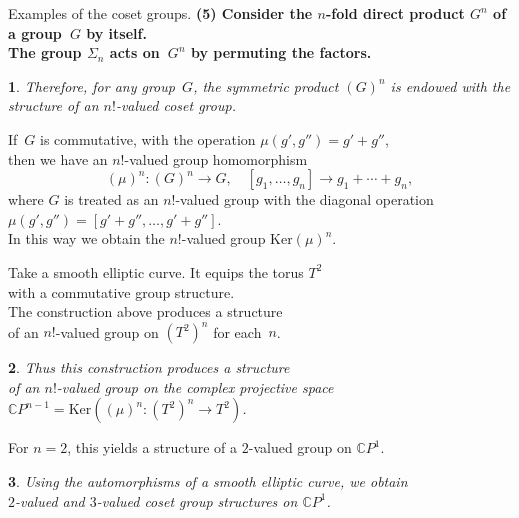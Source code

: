 \documentclass{beamer}
\newtheorem*{fr}{}
\begin{document}
\begin{frame}{Examples of the coset groups.}
\bf{(5)}  Consider the $n$-fold direct product $G^n$ of a group~$G$ by itself.\\
The group $\Sigma_n$ acts on~$G^n$ by permuting the factors.
\begin{fr}
Therefore, for any group~$G$, the symmetric product $(G)^n$ is endowed with the structure of an $n!$-valued coset group.
\end{fr}
If~$G$ is commutative, with the operation  $\mu(g',g'') = g'+g''$,\\
then we have an $n!$-valued group homomorphism
\[ (\mu)^n : (G)^n \longrightarrow G, \quad [g_1, \ldots, g_n] \longrightarrow g_1+ \cdots + g_n, \]
where $G$ is treated as an $n!$-valued group with the diagonal
operation $\mu(g',g'') = [g'+g'', \ldots, g'+g'']$.\\[5pt]
In this way we obtain the $n!$-valued group $\mathrm{Ker}(\mu)^n$.
\end{frame}




\begin{frame}{}
Take a smooth elliptic curve. It equips the torus  $T^2$\\ with a commutative group structure. \\
The construction above produces a structure\\ of an $n!$-valued group on $(T^2)^n$ for each~$n$.
\begin{fr}
Thus this construction produces a structure\\ of an $n!$-valued group on the complex projective space\\[3pt]
\qquad \qquad $\mathbb{C}P^{n-1}=\mathrm{Ker}((\mu)^n : (T^2)^n \to T^2)$.
\end{fr}

For $n=2$, this yields a structure of a $2$-valued group on $\mathbb{C}P^1$.
\begin{fr}
Using the automorphisms of a smooth elliptic curve, we obtain\\
$2$-valued and $3$-valued coset group structures on $\mathbb{C}P^1$.
\end{fr}
\end{frame}
\end{document}

